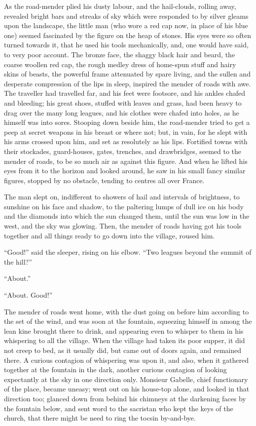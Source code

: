 As the road-mender plied his dusty labour, and the hail-clouds, rolling
away, revealed bright bars and streaks of sky which were responded to
by silver gleams upon the landscape, the little man (who wore a red cap
now, in place of his blue one) seemed fascinated by the figure on the
heap of stones.  His eyes were so often turned towards it, that he
used his tools mechanically, and, one would have said, to very poor
account.  The bronze face, the shaggy black hair and beard, the coarse
woollen red cap, the rough medley dress of home-spun stuff and hairy
skins of beasts, the powerful frame attenuated by spare living, and
the sullen and desperate compression of the lips in sleep, inspired
the mender of roads with awe.  The traveller had travelled far, and
his feet were footsore, and his ankles chafed and bleeding; his great
shoes, stuffed with leaves and grass, had been heavy to drag over the
many long leagues, and his clothes were chafed into holes, as he himself
was into sores.  Stooping down beside him, the road-mender tried to
get a peep at secret weapons in his breast or where not; but, in vain,
for he slept with his arms crossed upon him, and set as resolutely as
his lips.  Fortified towns with their stockades, guard-houses, gates,
trenches, and drawbridges, seemed to the mender of roads, to be so much
air as against this figure.  And when he lifted his eyes from it to
the horizon and looked around, he saw in his small fancy similar figures,
stopped by no obstacle, tending to centres all over France.

The man slept on, indifferent to showers of hail and intervals of
brightness, to sunshine on his face and shadow, to the paltering lumps
of dull ice on his body and the diamonds into which the sun changed
them, until the sun was low in the west, and the sky was glowing.
Then, the mender of roads having got his tools together and all things
ready to go down into the village, roused him.

``Good!'' said the sleeper, rising on his elbow.  ``Two leagues beyond
the summit of the hill?''

``About.''

``About.  Good!''

The mender of roads went home, with the dust going on before him
according to the set of the wind, and was soon at the fountain,
squeezing himself in among the lean kine brought there to drink, and
appearing even to whisper to them in his whispering to all the village.
When the village had taken its poor supper, it did not creep to bed,
as it usually did, but came out of doors again, and remained there.
A curious contagion of whispering was upon it, and also, when it
gathered together at the fountain in the dark, another curious contagion
of looking expectantly at the sky in one direction only.  Monsieur
Gabelle, chief functionary of the place, became uneasy; went out on
his house-top alone, and looked in that direction too; glanced down
from behind his chimneys at the darkening faces by the fountain below,
and sent word to the sacristan who kept the keys of the church, that
there might be need to ring the tocsin by-and-bye.

